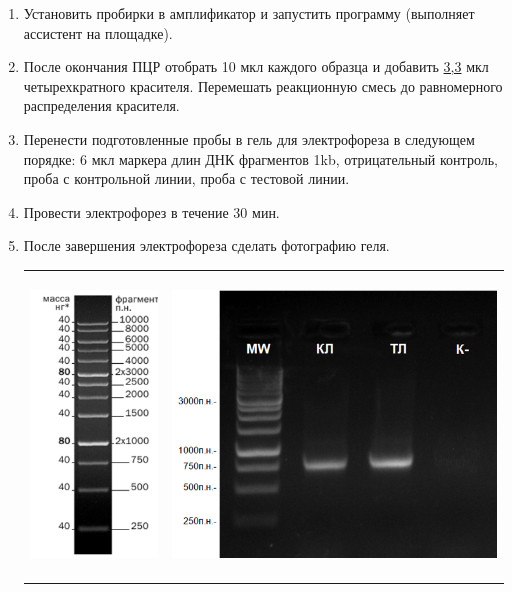 \begin{enumerate}
    \item Установить пробирки в амплификатор и запустить программу (выполняет ассистент на площадке).
    \item После окончания ПЦР отобрать 10 мкл каждого образца и добавить \underline{3,3} мкл четырехкратного красителя. Перемешать реакционную смесь до равномерного распределения красителя.
    \item Перенести подготовленные пробы в гель для электрофореза в следующем порядке:  6 мкл маркера длин ДНК фрагментов 1kb, отрицательный контроль, проба с контрольной линии, проба с тестовой линии.
    \item Провести электрофорез в течение 30 мин.
    \item После завершения электрофореза сделать фотографию геля.
    
    \begin{tabular}{cc}
        \includegraphics[height=8cm]{1.png}& \includegraphics[height=8cm]{2.png}\\
    \end{tabular}


\end{enumerate}
